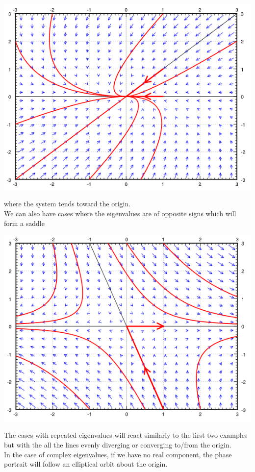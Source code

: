 \documentclass[11pt, fleqn]{article}
\begin{document}
\centerline{\includegraphics[scale=0.8]{ODEPictures/phasePortrait2.png}}
where the system tends toward the origin.\\
We can also have cases where the eigenvalues are of opposite signs which will form a saddle\\
\centerline{\includegraphics[scale=0.8]{ODEPictures/phasePortrait3.png}}
The cases with repeated eigenvalues will react similarly to the first two examples but with the all the lines evenly diverging or converging to/from the origin.\\
In the case of complex eigenvalues, if we have no real component, the phase portrait will follow an elliptical orbit about the origin.\\
\end{document}
